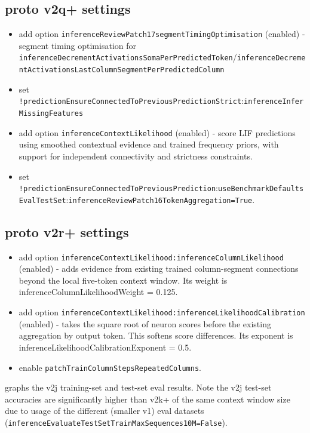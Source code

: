 \subsection{proto v2q+ settings}
\begin{itemize}
	\item add option \texttt{inferenceReviewPatch17segmentTimingOptimisation} (enabled) - segment timing optimisation for \texttt{inferenceDecrementActivationsSomaPerPredictedToken}/\texttt{inferenceDecrementActivationsLastColumnSegmentPerPredictedColumn}
	\item set \texttt{!predictionEnsureConnectedToPreviousPredictionStrict}:\texttt{inferenceInferMissingFeatures}
	\item add option \texttt{inferenceContextLikelihood} (enabled) - score LIF predictions using smoothed contextual evidence and trained frequency priors, with support for independent connectivity and strictness constraints.
      \item set \texttt{!predictionEnsureConnectedToPreviousPrediction}:\texttt{useBenchmarkDefaultsEvalTestSet}:\texttt{inferenceReviewPatch16TokenAggregation=True}.
\end{itemize}

\subsection{proto v2r+ settings}
\begin{itemize}
	\item add option \texttt{inferenceContextLikelihood:inferenceColumnLikelihood} (enabled) - adds evidence from existing trained column-segment connections beyond the local five-token context window. Its weight is inferenceColumnLikelihoodWeight = 0.125.
	\item add option \texttt{inferenceContextLikelihood:inferenceLikelihoodCalibration} (enabled) - takes the square root of neuron scores before the existing aggregation by output token. This softens score differences. Its exponent is inferenceLikelihoodCalibrationExponent = 0.5.
	\item enable \texttt{patchTrainColumnStepsRepeatedColumns}.
\end{itemize}

 graphs the v2j training-set and test-set eval results. Note the v2j test-set accuracies are significantly higher than v2k+ of the same context window size due to usage of the different (smaller v1) eval datasets (\texttt{inferenceEvaluateTestSetTrainMaxSequences10M=False}).

